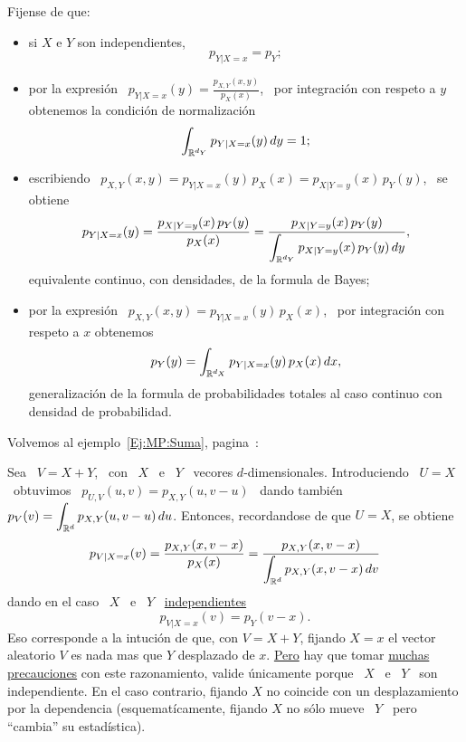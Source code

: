 {Fijense de  que:
%
\begin{itemize}
\item si $X$ e $Y$ son independientes,
  \[
  p_{Y|X=x} = p_Y;
  \]
%
\item por  la expresi\'on \ $p_{Y|X=x}(y) =  \frac{p_{X,Y}(x,y)}{p_X(x)}$, \ por
  integraci\'on con respeto a $y$ obtenemos la condici\'on de normalizaci\'on
  \[
  \int_{\mathbb{R}^{d_Y}} p_{Y|X=x}(y) \, dy = 1;
  \]
%
\item escribiendo  \ $p_{X,Y}(x,y)  = p_{Y|X=x}(y) \,  p_X(x) =  p_{X|Y=y}(x) \,
  p_Y(y)$, \ se obtiene
  \[
  p_{Y|X=x}(y)   =  \frac{p_{X|Y=y}(x) \,   p_Y(y)}{p_X(x)}   =  \frac{p_{X|Y=y}(x)
    \, p_Y(y)}{\displaystyle \int_{\mathbb{R}^{d_Y}} p_{X|Y=y}(x) \, p_Y(y) \, dy},
  \]
  equivalente continuo, con densidades, de la formula de Bayes;
%
\item  por la  expresi\'on  \ $p_{X,Y}(x,y)  =  p_{Y|X=x}(y) \,  p_X(x)$, \  por
  integraci\'on con respeto a $x$ obtenemos
  \[
  p_Y(y) = \int_{\mathbb{R}^{d_X}} p_{Y|X=x}(y) \, p_X(x) \, dx,
  \]
  generalizaci\'on de la formula de  probabilidades totales al caso continuo con
  densidad de probabilidad.
\end{itemize}

Volvemos al ejemplo~\ref{Ej:MP:Suma}, pagina~\pageref{Ej:MP:Suma}:
\begin{ejemplo}\label{Ej:MP:SumaCond}
  Sea   \   $V  =   X   +   Y$,  \   con   \   $X$  \   e   \   $Y$  \   vecores
  $d$-dimensionales.  Introduciendo \  $U =  X$  \ obtuvimos  \ $p_{U,V}(u,v)  =
  p_{X,Y}(u,v-u)$  \ dando  tambi\'en \  $\displaystyle p_V(v)  = \int_{\mathbb{R}^d}
  p_{X,Y}(u,v-u) \, du$. Entonces, recordandose de que $U = X$, se obtiene
  \[
  p_{V|X=x}(v)            =            \frac{p_{X,Y}(x,v-x)}{p_X(x)}           =
  \frac{p_{X,Y}(x,v-x)}{\displaystyle \int_{\mathbb{R}^d} p_{X,Y}(x,v-x) \, dv}
  \]
  dando en el caso \ $X$ \ e \ $Y$ \ \underline{independientes}
  \[
  p_{V|X=x}(v) = p_Y(v-x).
  \]
  Eso corresponde a  la intuci\'on de que, con $V  = X + Y$, fijando  $X = x$ el
  vector aleatorio $V$  es nada mas que $Y$  desplazado de $x$. \underline{Pero}
  hay que  tomar \underline{muchas  precauciones} con este  razonamiento, valide
  \'unicamente  porque  \ $X$  \  e  \ $Y$  \  son  independiente.   En el  caso
  contrario, fijando  $X$ no coincide  con un desplazamiento por  la dependencia
  (esquemat\'icamente, fijando  $X$ no s\'olo mueve  \ $Y$ \  pero ``cambia'' su
  estad\'istica).
\end{ejemplo}

  }


